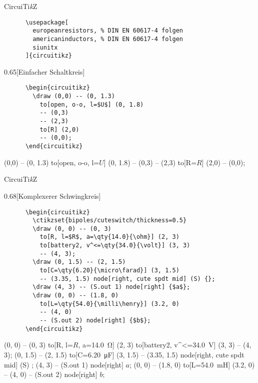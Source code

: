 \begin{frame}[fragile]{%
  CircuiTi\textit{k}Z
  \hfill
}
  \begin{Packages}
    \begin{verbatim}
      \usepackage[
        europeanresistors, % DIN EN 60617-4 folgen
        americaninductors, % DIN EN 60617-4 folgen
        siunitx
      ]{circuitikz}
    \end{verbatim}
  \end{Packages}
  \begin{CodeExample}{0.65}[Einfacher Schaltkreis]
    \begin{verbatim}
      \begin{circuitikz}
        \draw (0,0) -- (0, 1.3)
          to[open, o-o, l=$U$] (0, 1.8)
          -- (0,3)
          -- (2,3)
          to[R] (2,0)
          -- (0,0);
      \end{circuitikz}
    \end{verbatim}
  \CodeResult
    \begin{circuitikz}
      \draw (0,0) -- (0, 1.3)
          to[open, o-o, l=$U$] (0, 1.8)
          -- (0,3) -- (2,3)
          to[R=$R$] (2,0)
          -- (0,0);
      \end{circuitikz}
  \end{CodeExample}
\end{frame}

\begin{frame}[fragile]{CircuiTi\textit{k}Z}
  \begin{CodeExample}{0.68}[Komplexerer Schwingkreis]
    \begin{verbatim}
      \begin{circuitikz}
        \ctikzset{bipoles/cuteswitch/thickness=0.5}
        \draw (0, 0) -- (0, 3)
          to[R, l=$R$, a=\qty{14.0}{\ohm}] (2, 3)
          to[battery2, v^<=\qty{34.0}{\volt}] (3, 3)
          -- (4, 3);
        \draw (0, 1.5) -- (2, 1.5)
          to[C=\qty{6.20}{\micro\farad}] (3, 1.5)
          -- (3.35, 1.5) node[right, cute spdt mid] (S) {};
        \draw (4, 3) -- (S.out 1) node[right] {$a$};
        \draw (0, 0) -- (1.8, 0)
          to[L=\qty{54.0}{\milli\henry}] (3.2, 0)
          -- (4, 0)
          -- (S.out 2) node[right] {$b$};
      \end{circuitikz}
    \end{verbatim}
  \CodeResult
    \begin{circuitikz}
        \draw (0, 0) -- (0, 3)
          to[R, l=$R$, a=\qty{14.0}{\ohm}] (2, 3)
          to[battery2, v^<=\qty{34.0}{\volt}] (3, 3)
          -- (4, 3);
        \draw (0, 1.5) -- (2, 1.5)
          to[C=\qty{6.20}{\micro\farad}] (3, 1.5)
          -- (3.35, 1.5) node[right, cute spdt mid] (S) {};
        \draw (4, 3) -- (S.out 1) node[right] {$a$};
        \draw (0, 0) -- (1.8, 0)
          to[L=\qty{54.0}{\milli\henry}] (3.2, 0)
          -- (4, 0)
          -- (S.out 2) node[right] {$b$};
     \end{circuitikz}
  \end{CodeExample}
\end{frame}

